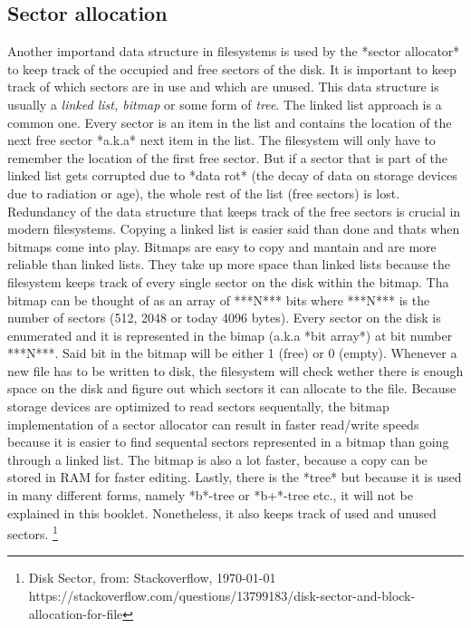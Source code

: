 \subsection{Sector allocation}

Another importand data structure in filesystems is used by the *sector allocator* to keep track of the
occupied and free sectors of the disk. It is important to keep track of which sectors are in use and
which are unused. This data structure is usually a \textit{linked list, bitmap} or some form of \textit{tree}. The
linked list approach is a common one. Every sector is an item in the list and contains the location of
the next free sector *a.k.a* next item in the list. The filesystem will only have to remember the
location of the first free sector. But if a sector that is part of the linked list gets corrupted due
to *data rot* (the decay of data on storage devices due to radiation or age), the whole rest of the
list (free sectors) is lost. Redundancy of the data structure that keeps track of the free sectors is
crucial in modern filesystems. Copying a linked list is easier said than done and thats when bitmaps
come into play. Bitmaps are easy to copy and mantain and are more reliable than linked lists. They
take up more space than linked lists because the filesystem keeps track of every single sector on the
disk within the bitmap. Tha bitmap can be thought of as an array of ***N*** bits where ***N*** is the
number of sectors (512, 2048 or today 4096 bytes). Every sector on the disk is enumerated and it is
represented in the bimap (a.k.a *bit array*) at bit number ***N***. Said bit in the bitmap will be
either 1 (free) or 0 (empty). Whenever a new file has to be written to disk, the filesystem will check
wether there is enough space on the disk and figure out which sectors it can allocate to the file.
Because storage devices are optimized to read sectors sequentally, the bitmap implementation of a
sector allocator can result in faster read/write speeds because it is easier to find sequental sectors
represented in a bitmap than going through a linked list. The bitmap is also a lot faster, because a
copy can be stored in RAM for faster editing. Lastly, there is the *tree* but because it is used in
many different forms, namely *b*-tree or *b+*-tree etc., it will not be explained in this booklet.
Nonetheless, it also keeps track of used and unused sectors. \footnote{Disk Sector, from: Stackoverflow, \today  \\ https://stackoverflow.com/questions/13799183/disk-sector-and-block-allocation-for-file}


